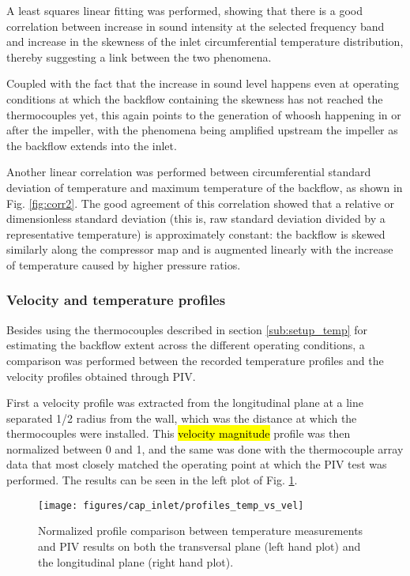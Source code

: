 A least squares linear fitting was performed, showing that there is a good correlation between increase in sound intensity at the selected frequency band and increase in the skewness of the inlet circumferential temperature distribution, thereby suggesting a link between the two phenomena.

Coupled with the fact that the increase in sound level happens even at operating conditions at which the backflow containing the skewness has not reached the thermocouples yet, this again points to the generation of whoosh happening in or after the impeller, with the phenomena being amplified upstream the impeller as the backflow extends into the inlet.

Another linear correlation was performed between circumferential standard deviation of temperature and maximum temperature of the backflow, as shown in Fig. \ref{fig:corr2}. The good agreement of this correlation showed that a relative or dimensionless standard deviation (this is, raw standard deviation divided by a representative temperature) is approximately constant: the backflow is skewed similarly along the compressor map and is augmented linearly with the increase of temperature caused by higher pressure ratios.

\subsubsection{Velocity and temperature profiles}

Besides using the thermocouples described in section \ref{sub:setup_temp} for estimating the backflow extent across the different operating conditions, a comparison was performed between the recorded temperature profiles and the velocity profiles obtained through PIV.

First a velocity profile was extracted from the longitudinal plane at a line  separated 1/2 radius from the wall, which was the distance at which the thermocouples were installed. This \hl{velocity magnitude} profile was then normalized between 0 and 1, and the same was done with the thermocouple array data that most closely matched the operating point at which the PIV test was performed. The results can be seen in the left plot of Fig. \ref{fig:profiles_temp_vs_vel}.

\begin{figure}[tb!]
\centering
\texttt{[image: figures/cap\_inlet/profiles\_temp\_vs\_vel]}
\caption{Normalized profile comparison between temperature measurements and PIV results on both the transversal plane (left hand plot) and the longitudinal plane (right hand plot).}
\label{fig:profiles_temp_vs_vel}
\end{figure}

